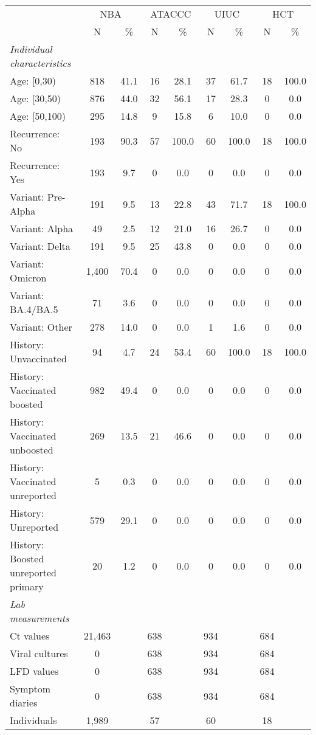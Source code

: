 \documentclass[11pt]{article}
\begin{document}
\begin{table}[p]
    \centering
    \small
    \begin{tabular}{lcccccccc}
     \toprule
     & \multicolumn{2}{c}{NBA} & \multicolumn{2}{c}{ATACCC} & \multicolumn{2}{c}{UIUC}  & \multicolumn{2}{c}{HCT} \\
      & N & \%& N & \% & N & \% & N & \% \\
     \midrule
     \textit{Individual characteristics} &  &  &  &  &  &  &  &  \\
     Age: [0,30) & 818 & 41.1 & 16 & 28.1 & 37 & 61.7 & 18 & 100.0 \\
     Age: [30,50) & 876 & 44.0 & 32 & 56.1 & 17 & 28.3 & 0 & 0.0 \\
     Age: [50,100) & 295 & 14.8 & 9 & 15.8 & 6 & 10.0 & 0 & 0.0 \\
     Recurrence: No & 193 & 90.3 & 57 & 100.0 & 60 & 100.0 & 18 & 100.0 \\
     Recurrence: Yes & 193 & 9.7 & 0 & 0.0 & 0 & 0.0 & 0 & 0.0 \\
     Variant: Pre-Alpha & 191 & 9.5 & 13 & 22.8 & 43 & 71.7 & 18 & 100.0 \\
     Variant: Alpha & 49 & 2.5 & 12 & 21.0 & 16 & 26.7 & 0 & 0.0 \\
     Variant: Delta & 191 & 9.5 & 25 & 43.8 & 0 & 0.0 & 0 & 0.0 \\
     Variant: Omicron & 1,400 & 70.4 & 0 & 0.0 & 0 & 0.0 & 0 & 0.0 \\
     Variant: BA.4/BA.5 & 71 & 3.6 & 0 & 0.0 & 0 & 0.0 & 0 & 0.0 \\
     Variant: Other & 278 & 14.0 & 0 & 0.0 & 1 & 1.6 & 0 & 0.0\\
     History: Unvaccinated & 94 & 4.7 & 24 & 53.4 & 60 & 100.0 & 18 & 100.0 \\
     History: Vaccinated boosted & 982 & 49.4 & 0 & 0.0 & 0 & 0.0 & 0 & 0.0 \\
     History: Vaccinated unboosted & 269 & 13.5 & 21 & 46.6 & 0 & 0.0 & 0 & 0.0\\
     History: Vaccinated unreported & 5 & 0.3 & 0 & 0.0 & 0 & 0.0 & 0 & 0.0\\
     History: Unreported & 579 & 29.1 & 0 & 0.0 & 0 & 0.0 & 0 & 0.0\\
     History: Boosted unreported primary & 20 & 1.2 & 0 &0.0 & 0 & 0.0 & 0 & 0.0\\
     \midrule
     \textit{Lab measurements} &  &  &  &  &  &  &  &  \\
        Ct values & 21,463 & & 638 & & 934 & & 684 \\
        Viral cultures & 0 & & 638 & & 934 & & 684 \\
        LFD values & 0 & & 638 & & 934 & & 684 \\
        Symptom diaries & 0 & & 638 & & 934 & & 684 \\
     \midrule
     Individuals & 1,989 &  & 57 & & 60 & & 18 \\
     \bottomrule
     \end{tabular}
    \label{tab:my_label}
\end{table}
\end{document}
